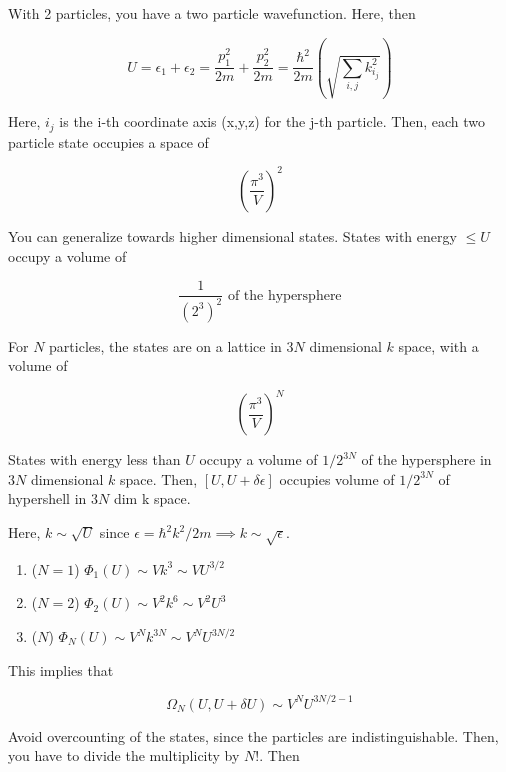 \documentclass{article}
\newtheorem{one minute paper}[theorem]{One Minute Paper}
\begin{document}
With 2 particles, you have a two particle wavefunction. Here, then 

\begin{equation}
    U = \epsilon_1 + \epsilon_2 = \frac{p_1^2}{2m} + \frac{p_2^2}{2m} = \frac{\hbar^2}{2m}\left( \sqrt{\sum_{i,j} k_{i_j}^2} \right)
\end{equation}

Here, $i_j$ is the i-th coordinate axis (x,y,z) for the j-th particle. Then, each two particle state occupies a space of

\begin{equation}
    \left( \frac{\pi^3}{V} \right)^2
\end{equation}

You can generalize towards higher dimensional states. States with energy $\leq U$ occupy a volume of 

\begin{equation}
    \frac{1}{(2^3)^2} \text{ of the hypersphere}
\end{equation}

For $N$ particles, the states are on a lattice in $3N$ dimensional $k$ space, with a volume of 

\begin{equation}
    \left( \frac{\pi^3}{V} \right)^N
\end{equation}

States with energy less than $U$ occupy a volume of $1/2^{3N}$ of the hypersphere in $3N$ dimensional $k$ space. Then, $[U, U + \delta\epsilon]$ occupies volume of $1/2^{3N}$ of hypershell in $3N$ dim k space. 

Here, $k \sim \sqrt{U}$ since $\epsilon = \hbar^2k^2/2m \implies k \sim \sqrt{\epsilon}$.
\begin{enumerate}
    \item ($N=1$) $\Phi_1(U) \sim Vk^3 \sim VU^{3/2}$
    \item ($N=2$) $\Phi_2(U) \sim V^2k^6 \sim V^2 U^{3}$
    \item ($N$) $\Phi_N(U) \sim V^{N}k^{3N} \sim V^{N}U^{3N/2}$
\end{enumerate}

This implies that 

\begin{equation}
    \Omega_N(U, U + \delta U) \sim V^{N}U^{3N/2 - 1}
\end{equation}

Avoid overcounting of the states, since the particles are indistinguishable. Then, you have to divide the multiplicity by $N!$. Then 
\end{document}
